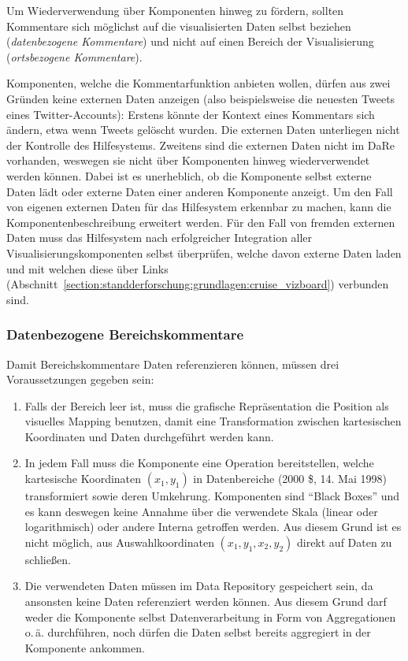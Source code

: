 \documentclass[
	headsepline,
	footsepline,
	fontsize=12pt,
	bibliography=totoc
]{scrbook}
\begin{document}

Um Wiederverwendung über Komponenten hinweg zu fördern, sollten Kommentare sich möglichst auf die visualisierten Daten selbst beziehen (\emph{datenbezogene Kommentare}) und nicht auf einen Bereich der Visualisierung (\emph{ortsbezogene Kommentare}).

Komponenten, welche die Kommentarfunktion anbieten wollen, dürfen aus zwei Gründen keine externen Daten anzeigen (also beispielsweise die neuesten Tweets eines Twitter-Accounts): Erstens könnte der Kontext eines Kommentars sich ändern, etwa wenn Tweets gelöscht wurden. Die externen Daten unterliegen nicht der Kontrolle des Hilfesystems. Zweitens sind die externen Daten nicht im DaRe vorhanden, weswegen sie nicht über Komponenten hinweg wiederverwendet werden können. Dabei ist es unerheblich, ob die Komponente selbst externe Daten lädt oder externe Daten einer anderen Komponente anzeigt. Um den Fall von eigenen externen Daten für das Hilfesystem erkennbar zu machen, kann die Komponentenbeschreibung erweitert werden. Für den Fall von fremden externen Daten muss das Hilfesystem nach erfolgreicher Integration aller Visualisierungskomponenten selbst überprüfen, welche davon externe Daten laden und mit welchen diese über Links (Abschnitt~\ref{section:standderforschung:grundlagen:cruise_vizboard}) verbunden sind.

\subsubsection{Datenbezogene Bereichskommentare}

Damit Bereichskommentare Daten referenzieren können, müssen drei Voraussetzungen gegeben sein:

\begin{enumerate}
	\item Falls der Bereich leer ist, muss die grafische Repräsentation die Position als visuelles Mapping benutzen, damit eine Transformation zwischen kartesischen Koordinaten und Daten durchgeführt werden kann.
	\item In jedem Fall muss die Komponente eine Operation bereitstellen, welche kartesische Koordinaten $(x_1,y_1)$ in Datenbereiche (2000 \$, 14. Mai 1998) transformiert sowie deren Umkehrung. Komponenten sind \enquote{Black Boxes} und es kann deswegen keine Annahme über die verwendete Skala (linear oder logarithmisch) oder andere Interna getroffen werden. Aus diesem Grund ist es nicht möglich, aus Auswahlkoordinaten $(x_1,y_1,x_2,y_2)$ direkt auf Daten zu schließen.
	\item Die verwendeten Daten müssen im Data Repository gespeichert sein, da ansonsten keine Daten referenziert werden können. Aus diesem Grund darf weder die Komponente selbst Datenverarbeitung in Form von Aggregationen o.\,ä. durchführen, noch dürfen die Daten selbst bereits aggregiert in der Komponente ankommen.
\end{enumerate}
\end{document}
